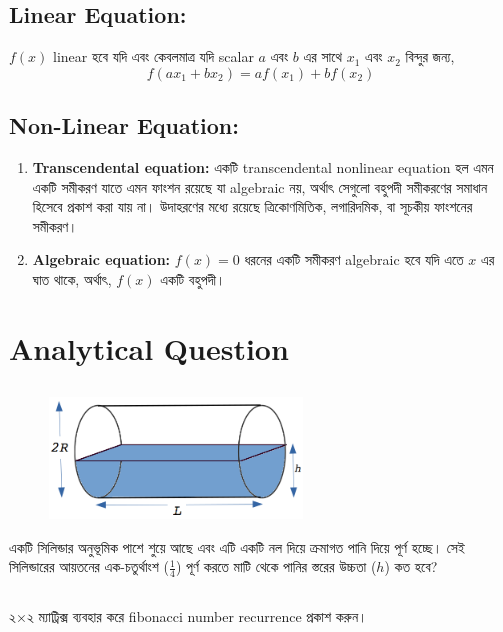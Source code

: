 \documentclass{article}
\newcommand{\textben}[1]{{\bengalifont #1}}
\begin{document}
\subsection{Linear Equation:}
$f(x)$ linear \textben{হবে যদি এবং কেবলমাত্র যদি} scalar $a$ \textben{এবং} $b$ \textben{এর সাথে} $x_1$ \textben{এবং} $x_2$ \textben{বিন্দুর জন্য,}
$$f(ax_1 + bx_2) = af(x_1) + bf(x_2)$$
\subsection{Non-Linear Equation:} 
\begin{enumerate}
\item  \textbf{Transcendental equation:} \textben{একটি} transcendental nonlinear equation \textben{হল এমন একটি সমীকরণ যাতে এমন ফাংশন রয়েছে যা} algebraic \textben{নয়, অর্থাৎ সেগুলো বহুপদী সমীকরণের সমাধান হিসেবে প্রকাশ করা যায় না। উদাহরণের মধ্যে রয়েছে ত্রিকোণমিতিক, লগারিদমিক, বা সূচকীয় ফাংশনের সমীকরণ।}
\item \textbf{Algebraic equation:} $f(x) = 0$ \textben{ধরনের একটি সমীকরণ} algebraic \textben{হবে যদি এতে} $x$ \textben{এর ঘাত থাকে, অর্থাৎ,} $f(x)$ \textben{একটি বহুপদী।}
\end{enumerate}
\newpage 
\section{Analytical Question}
\subsection{}
\begin{figure}[htbp]
  \centering
  \includegraphics[width=0.6\textwidth]{cylinder.png} %
  
  \label{fig:my_label}
\end{figure}
\textben{একটি সিলিন্ডার অনুভূমিক পাশে শুয়ে আছে এবং এটি একটি নল দিয়ে ক্রমাগত পানি দিয়ে পূর্ণ হচ্ছে। সেই সিলিন্ডারের আয়তনের এক-চতুর্থাংশ} ($\frac{1}{4}$) \textben{পূর্ণ করতে মাটি থেকে পানির স্তরের উচ্চতা} ($h$) \textben{কত হবে?}
\subsection{}
\textben{২×২ ম্যাট্রিক্স ব্যবহার করে} fibonacci number recurrence \textben{প্রকাশ করুন।}
\end{document}
